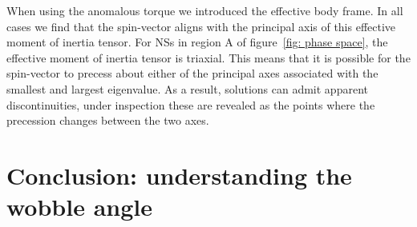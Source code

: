 \documentclass[../full_thesis/full_thesis.tex]{subfiles}
\begin{document}
When using the anomalous torque we introduced the effective body frame.
In all cases we find that the spin-vector aligns with
the principal axis of this effective moment of inertia tensor. For NSs in
region A of figure~\ref{fig: phase space}, the effective moment of inertia tensor
is triaxial. This means that it is possible for the spin-vector to precess
about either of the principal axes associated with the smallest and largest
eigenvalue. As a result, solutions can admit apparent discontinuities, under
inspection these are revealed as the points where the precession changes
between the two axes.

\section{Conclusion: understanding the wobble angle}

%
\end{document}
